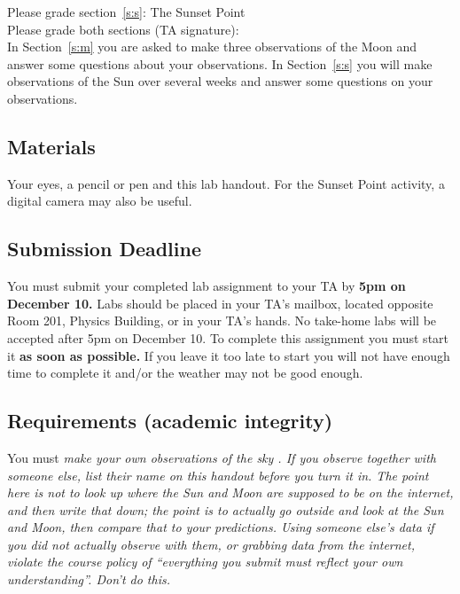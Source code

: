 \documentclass[11pt]{article}
\begin{document}
\vspace*{0.5cm}
\noindent
Please grade section~\ref{s:s}: The Sunset Point \hrulefill\hspace*{6cm}\\

\vspace*{0.5cm}
\noindent
Please grade both sections (TA signature): \hrulefill\hspace*{6cm}\\





In Section~\ref{s:m} you are asked to make three observations of the Moon 
and answer some questions about your observations. In Section~\ref{s:s} you
will make observations of the Sun over several weeks and answer some questions
on your observations.

\subsection*{Materials}

Your eyes, a pencil or pen and this lab handout. For the Sunset Point activity, a digital camera may also be useful.

\subsection*{Submission Deadline}

You must submit your completed lab assignment to your TA by \textbf{5pm on
December 10.} Labs should be placed in your TA's mailbox, located opposite
Room 201, Physics Building, or in your TA's hands. 
No take-home labs will be accepted
after 5pm on December 10. To complete this assignment you must start it
\textbf{as soon as possible.} If you leave it too late to start you will not
have enough time to complete it and/or the weather may not be good enough.

\subsection*{Requirements (academic integrity)}

You must \it make your own observations of the sky \rm. If you observe together with someone else,
list their name on this handout before you turn it in. The point here is not to look up where the 
Sun and Moon are supposed to be on the internet, and then write that down; the point is to actually
go outside and look at the Sun and Moon, then compare that to your predictions. Using someone else's
data if you did not actually observe with them, or grabbing data from the internet, violate the course
policy of ``everything you submit must reflect your own understanding''. Don't do this.
\end{document}
